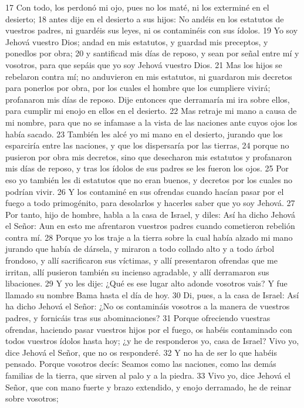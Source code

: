 17 Con todo, los perdonó mi ojo, pues no los maté, ni los exterminé en el desierto;
18 antes dije en el desierto a sus hijos: No andéis en los estatutos de vuestros padres, ni guardéis sus leyes, ni os contaminéis con sus ídolos. 
19 Yo soy Jehová vuestro Dios; andad en mis estatutos, y guardad mis preceptos, y ponedlos por obra;
20 y santificad mis días de reposo, y sean por señal entre mí y vosotros, para que sepáis que yo soy Jehová vuestro Dios.
21 Mas los hijos se rebelaron contra mí; no anduvieron en mis estatutos, ni guardaron mis decretos para ponerlos por obra, por los cuales el hombre que los cumpliere vivirá; profanaron mis días de reposo. Dije entonces que derramaría mi ira sobre ellos, para cumplir mi enojo en ellos en el desierto.
22 Mas retraje mi mano a causa de mi nombre, para que no se infamase a la vista de las naciones ante cuyos ojos los había sacado.
23 También les alcé yo mi mano en el desierto, jurando que los esparciría entre las naciones, y que los dispersaría por las tierras, 
24 porque no pusieron por obra mis decretos, sino que desecharon mis estatutos y profanaron mis días de reposo, y tras los ídolos de sus padres se les fueron los ojos.
25 Por eso yo también les di estatutos que no eran buenos, y decretos por los cuales no podrían vivir.
26 Y los contaminé en sus ofrendas cuando hacían pasar por el fuego a todo primogénito, para desolarlos y hacerles saber que yo soy Jehová.
27 Por tanto, hijo de hombre, habla a la casa de Israel, y diles: Así ha dicho Jehová el Señor: Aun en esto me afrentaron vuestros padres cuando cometieron rebelión contra mí.
28 Porque yo los traje a la tierra sobre la cual había alzado mi mano jurando que había de dársela, y miraron a todo collado alto y a todo árbol frondoso, y allí sacrificaron sus víctimas, y allí presentaron ofrendas que me irritan, allí pusieron también su incienso agradable, y allí derramaron sus libaciones.
29 Y yo les dije: ¿Qué es ese lugar alto adonde vosotros vais? Y fue llamado su nombre Bama hasta el día de hoy.
30 Di, pues, a la casa de Israel: Así ha dicho Jehová el Señor: ¿No os contamináis vosotros a la manera de vuestros padres, y fornicáis tras sus abominaciones?
31 Porque ofreciendo vuestras ofrendas, haciendo pasar vuestros hijos por el fuego, os habéis contaminado con todos vuestros ídolos hasta hoy; ¿y he de responderos yo, casa de Israel? Vivo yo, dice Jehová el Señor, que no os responderé.
32 Y no ha de ser lo que habéis pensado. Porque vosotros decís: Seamos como las naciones, como las demás familias de la tierra, que sirven al palo y a la piedra.
33 Vivo yo, dice Jehová el Señor, que con mano fuerte y brazo extendido, y enojo derramado, he de reinar sobre vosotros;
